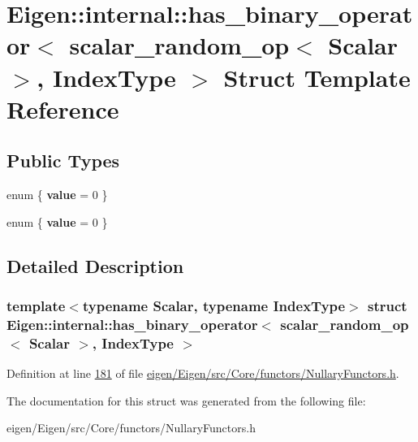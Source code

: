 \hypertarget{struct_eigen_1_1internal_1_1has__binary__operator_3_01scalar__random__op_3_01_scalar_01_4_00_01_index_type_01_4}{}\section{Eigen\+:\+:internal\+:\+:has\+\_\+binary\+\_\+operator$<$ scalar\+\_\+random\+\_\+op$<$ Scalar $>$, Index\+Type $>$ Struct Template Reference}
\label{struct_eigen_1_1internal_1_1has__binary__operator_3_01scalar__random__op_3_01_scalar_01_4_00_01_index_type_01_4}
\subsection*{Public Types}
\begin{DoxyCompactItemize}
\item 
\mbox{\label{struct_eigen_1_1internal_1_1has__binary__operator_3_01scalar__random__op_3_01_scalar_01_4_00_01_index_type_01_4_a4520b85db4b623c23c0d5f2fdae564a2}} 
enum \{ {\bfseries value} = 0
 \}
\item 
\mbox{\label{struct_eigen_1_1internal_1_1has__binary__operator_3_01scalar__random__op_3_01_scalar_01_4_00_01_index_type_01_4_aede46907e786c9efc40096f21584450d}} 
enum \{ {\bfseries value} = 0
 \}
\end{DoxyCompactItemize}


\subsection{Detailed Description}
\subsubsection*{template$<$typename Scalar, typename Index\+Type$>$\newline
struct Eigen\+::internal\+::has\+\_\+binary\+\_\+operator$<$ scalar\+\_\+random\+\_\+op$<$ Scalar $>$, Index\+Type $>$}



Definition at line \hyperlink{eigen_2_eigen_2src_2_core_2functors_2_nullary_functors_8h_source_l00181}{181} of file \hyperlink{eigen_2_eigen_2src_2_core_2functors_2_nullary_functors_8h_source}{eigen/\+Eigen/src/\+Core/functors/\+Nullary\+Functors.\+h}.



The documentation for this struct was generated from the following file\+:\begin{DoxyCompactItemize}
\item 
eigen/\+Eigen/src/\+Core/functors/\+Nullary\+Functors.\+h\end{DoxyCompactItemize}
